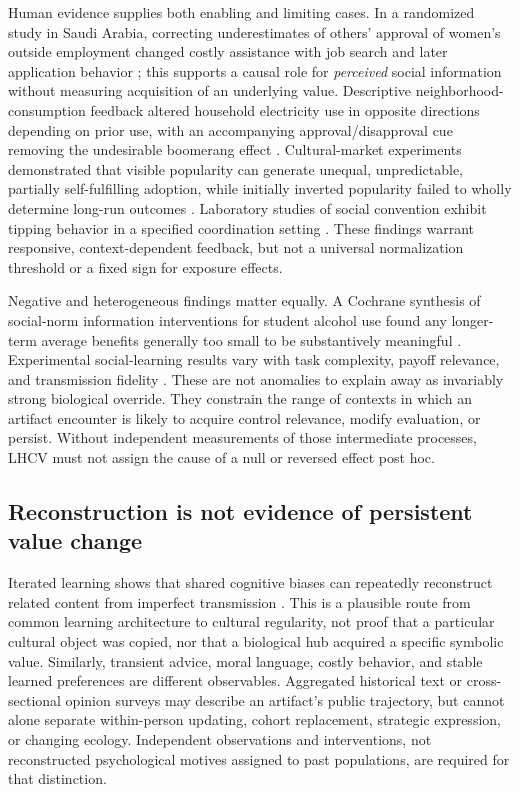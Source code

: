 \documentclass[11pt,a4paper]{article}
\begin{document}
Human evidence supplies both enabling and limiting cases. In a randomized study in Saudi Arabia, correcting underestimates of others' approval of women's outside employment changed costly assistance with job search and later application behavior \citep{bursztyn2020}; this supports a causal role for \emph{perceived} social information without measuring acquisition of an underlying value. Descriptive neighborhood-consumption feedback altered household electricity use in opposite directions depending on prior use, with an accompanying approval/disapproval cue removing the undesirable boomerang effect \citep{schultz2007}. Cultural-market experiments demonstrated that visible popularity can generate unequal, unpredictable, partially self-fulfilling adoption, while initially inverted popularity failed to wholly determine long-run outcomes \citep{salganik2006,salganik2008}. Laboratory studies of social convention exhibit tipping behavior in a specified coordination setting \citep{centola2018}. These findings warrant responsive, context-dependent feedback, but not a universal normalization threshold or a fixed sign for exposure effects.

Negative and heterogeneous findings matter equally. A Cochrane synthesis of social-norm information interventions for student alcohol use found any longer-term average benefits generally too small to be substantively meaningful \citep{foxcroft2015}. Experimental social-learning results vary with task complexity, payoff relevance, and transmission fidelity \citep{muthukrishna2016}. These are not anomalies to explain away as invariably strong biological override. They constrain the range of contexts in which an artifact encounter is likely to acquire control relevance, modify evaluation, or persist. Without independent measurements of those intermediate processes, LHCV must not assign the cause of a null or reversed effect post hoc.

\subsection{Reconstruction is not evidence of persistent value change}
Iterated learning shows that shared cognitive biases can repeatedly reconstruct related content from imperfect transmission \citep{griffiths2007,kalish2007}. This is a plausible route from common learning architecture to cultural regularity, not proof that a particular cultural object was copied, nor that a biological hub acquired a specific symbolic value. Similarly, transient advice, moral language, costly behavior, and stable learned preferences are different observables. Aggregated historical text or cross-sectional opinion surveys may describe an artifact's public trajectory, but cannot alone separate within-person updating, cohort replacement, strategic expression, or changing ecology. Independent observations and interventions, not reconstructed psychological motives assigned to past populations, are required for that distinction.
\end{document}
